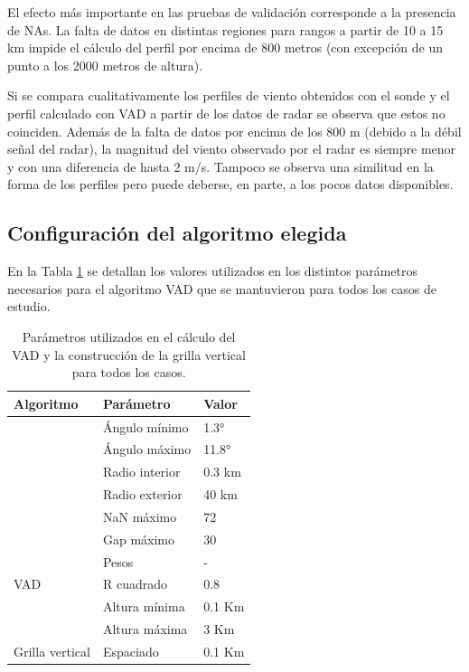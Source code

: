 \documentclass[12pt,spanish,oneside]{book}
\begin{document}
El efecto más importante en las pruebas de validación corresponde a la
presencia de NAs. La falta de datos en distintas regiones para rangos a
partir de 10 a 15 km impide el cálculo del perfil por encima de 800
metros (con excepción de un punto a los 2000 metros de altura).

Si se compara cualitativamente los perfiles de viento obtenidos con el
sonde y el perfil calculado con VAD a partir de los datos de radar se
observa que estos no coinciden. Además de la falta de datos por encima
de los 800 m (debido a la débil señal del radar), la magnitud del viento
observado por el radar es siempre menor y con una diferencia de hasta 2
m/s. Tampoco se observa una similitud en la forma de los perfiles pero
puede deberse, en parte, a los pocos datos disponibles.

\subsection{Configuración del algoritmo
elegida}\label{configuracion-del-algoritmo-elegida}

En la Tabla \ref{parametros} se detallan los valores utilizados en los
distintos parámetros necesarios para el algoritmo VAD que se mantuvieron
para todos los casos de estudio.

\begin{table}

\caption{\label{tab:parametros}Parámetros utilizados en el cálculo del VAD y la construcción de la grilla vertical para todos los casos. \label{parametros}}
\centering
\begin{tabular}[t]{lll}
\toprule
Algoritmo & Parámetro & Valor\\
\midrule
 & Ángulo mínimo & 1.3°\\
\cmidrule{2-3}
 & Ángulo máximo & 11.8°\\
\cmidrule{2-3}
 & Radio interior & 0.3 km\\
\cmidrule{2-3}
 & Radio exterior & 40 km\\
\cmidrule{2-3}
 & NaN máximo & 72\\
\cmidrule{2-3}
 & Gap máximo & 30\\
\cmidrule{2-3}
 & Pesos & -\\
\cmidrule{2-3}
\multirow{-8}{*}{\raggedright\arraybackslash VAD} & R cuadrado & 0.8\\
\cmidrule{1-3}
 & Altura mínima & 0.1 Km\\
\cmidrule{2-3}
 & Altura máxima & 3 Km\\
\cmidrule{2-3}
\multirow{-3}{*}{\raggedright\arraybackslash Grilla vertical} & Espaciado & 0.1 Km\\
\bottomrule
\end{tabular}
\end{table}
\end{document}
